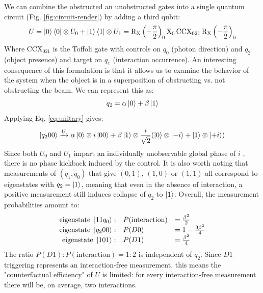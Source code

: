\documentclass{article}
\newcommand{\X}{\text{X}}
\newcommand{\RX}{\mathrm{R_X}}
\newcommand{\CCX}{\text{CCX}}
\begin{document}
We can combine the obstructed an unobstructed gates into a single quantum circuit (Fig. \ref{fig:circuit-render}) by adding a third qubit:
\begin{equation} \label{eq:unitary}
U = \ket 0\bra 0 \otimes U_0 + \ket 1\bra 1 \otimes U_1 = \RX\left(-\frac{\pi}{2}\right)_0 \X_0 \, \CCX_{021} \, \RX\left(-\frac{\pi}{2}\right)_0
\end{equation}
Where $\CCX_{021}$ is the Toffoli gate with controls on $q_0$ (photon direction) and $q_2$ (object presence) and target on $q_1$ (interaction occurrence). An interesting consequence of this formulation is that it allows us to examine the behavior of the system when the object is in a superposition of obstructing vs. not obstructing the beam. We can represent this as:
$$q_2 = \alpha \ket 0 + \beta \ket 1$$
Applying Eq. \ref{eq:unitary} gives:
\begin{equation}
\ket{q_2 0 0} \xrightarrow{U} \alpha\ket 0 \otimes i\ket{00} + \beta \ket 1 \otimes \frac{i}{\sqrt{2}}(\ket0 \otimes \ket{-i} + \ket1 \otimes \ket{+i})
\end{equation}
Since both $U_0$ and $U_1$ impart an individually unobservable global phase of $i$ , there is no phase kickback induced by the control. It is also worth noting that measurements of $(q_1, q_0)$ that give $(0, 1)$, $(1, 0)$ or $(1, 1)$ all correspond to eigenstates with $q_2 = \ket 1$, meaning that even in the absence of interaction, a positive measurement still induces collapse of $q_2$ to $\ket 1$. Overall, the measurement probabilities amount to:
$$\begin{array}{ r l l }
\text{eigenstate }\ket{1 1 q_0}: & P(\text{interaction}) & = \frac{\beta^2}{2} \\
\text{eigenstate }\ket{q_2 0 0}: & P(D0) & = 1 - \frac{3 \beta^2}{4} \\
\text{eigenstate }\ket{1 0 1}: & P(D1) & = \frac{\beta^2}{4}
\end{array}$$
The ratio $P(D1) : P(\text{interaction}) = 1 : 2$ is independent of $q_2$. Since $D1$ triggering represents an interaction-free measurement, this means the "counterfactual efficiency" of $U$ is limited: for every interaction-free measurement there will be, on average, two interactions.
\end{document}
